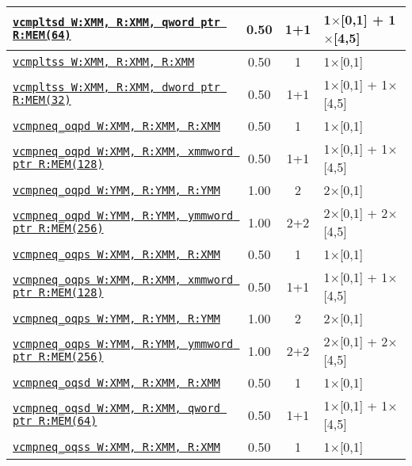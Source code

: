 \documentclass[a4paper,english,fontsize=9]{scrartcl}
\begin{document}
\begin{longtable}{p{}ccL{.25\textwidth}}
  \midrule
  \texttt{\href{https://felixcloutier.com/x86/CMPSD.html}{vcmpltsd W:XMM, R:XMM, qword ptr R:MEM(64)}} & 0.50 & 1+1 & 1\(\times\)[0,1] + 1\(\times\)[4,5] \\
  \midrule
  \texttt{\href{https://felixcloutier.com/x86/CMPSS.html}{vcmpltss W:XMM, R:XMM, R:XMM}} & 0.50 & 1 & 1\(\times\)[0,1] \\
  \midrule
  \texttt{\href{https://felixcloutier.com/x86/CMPSS.html}{vcmpltss W:XMM, R:XMM, dword ptr R:MEM(32)}} & 0.50 & 1+1 & 1\(\times\)[0,1] + 1\(\times\)[4,5] \\
  \midrule
  \texttt{\href{https://felixcloutier.com/x86/CMPPD.html}{vcmpneq\_oqpd W:XMM, R:XMM, R:XMM}} & 0.50 & 1 & 1\(\times\)[0,1] \\
  \midrule
  \texttt{\href{https://felixcloutier.com/x86/CMPPD.html}{vcmpneq\_oqpd W:XMM, R:XMM, xmmword ptr R:MEM(128)}} & 0.50 & 1+1 & 1\(\times\)[0,1] + 1\(\times\)[4,5] \\
  \midrule
  \texttt{\href{https://felixcloutier.com/x86/CMPPD.html}{vcmpneq\_oqpd W:YMM, R:YMM, R:YMM}} & 1.00 & 2 & 2\(\times\)[0,1] \\
  \midrule
  \texttt{\href{https://felixcloutier.com/x86/CMPPD.html}{vcmpneq\_oqpd W:YMM, R:YMM, ymmword ptr R:MEM(256)}} & 1.00 & 2+2 & 2\(\times\)[0,1] + 2\(\times\)[4,5] \\
  \midrule
  \texttt{\href{https://felixcloutier.com/x86/CMPPS.html}{vcmpneq\_oqps W:XMM, R:XMM, R:XMM}} & 0.50 & 1 & 1\(\times\)[0,1] \\
  \midrule
  \texttt{\href{https://felixcloutier.com/x86/CMPPS.html}{vcmpneq\_oqps W:XMM, R:XMM, xmmword ptr R:MEM(128)}} & 0.50 & 1+1 & 1\(\times\)[0,1] + 1\(\times\)[4,5] \\
  \midrule
  \texttt{\href{https://felixcloutier.com/x86/CMPPS.html}{vcmpneq\_oqps W:YMM, R:YMM, R:YMM}} & 1.00 & 2 & 2\(\times\)[0,1] \\
  \midrule
  \texttt{\href{https://felixcloutier.com/x86/CMPPS.html}{vcmpneq\_oqps W:YMM, R:YMM, ymmword ptr R:MEM(256)}} & 1.00 & 2+2 & 2\(\times\)[0,1] + 2\(\times\)[4,5] \\
  \midrule
  \texttt{\href{https://felixcloutier.com/x86/CMPSD.html}{vcmpneq\_oqsd W:XMM, R:XMM, R:XMM}} & 0.50 & 1 & 1\(\times\)[0,1] \\
  \midrule
  \texttt{\href{https://felixcloutier.com/x86/CMPSD.html}{vcmpneq\_oqsd W:XMM, R:XMM, qword ptr R:MEM(64)}} & 0.50 & 1+1 & 1\(\times\)[0,1] + 1\(\times\)[4,5] \\
  \midrule
  \texttt{\href{https://felixcloutier.com/x86/CMPSS.html}{vcmpneq\_oqss W:XMM, R:XMM, R:XMM}} & 0.50 & 1 & 1\(\times\)[0,1] \\

\end{longtable}
\end{document}
